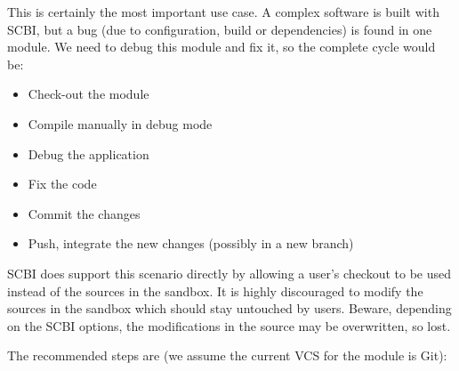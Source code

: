 \documentclass[a4paper,12pt,twoside]{article}
\begin{document}
This is certainly the most important use case. A complex software is built with SCBI, but a bug (due to configuration, build or dependencies) is found in one module. We need to debug this module and fix it, so the complete cycle would be:

\begin{itemize}
	\item Check-out the module
	\item Compile manually in debug mode
	\item Debug the application
	\item Fix the code
	\item Commit the changes
	\item Push, integrate the new changes (possibly in a new branch)
\end{itemize}

SCBI does support this scenario directly by allowing a user's checkout to be used instead of the sources in the sandbox. It is highly discouraged to modify the sources in the sandbox which should stay untouched by users. Beware, depending on the SCBI options, the modifications in the source may be overwritten, so lost.

The recommended steps are (we assume the current VCS for the module is Git):
\end{document}
